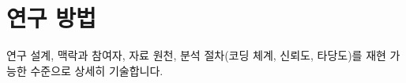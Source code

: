 \section{연구 방법}\label{sec:methods-kr}


연구 설계, 맥락과 참여자, 자료 원천, 분석 절차(코딩 체계, 신뢰도, 타당도)를
재현 가능한 수준으로 상세히 기술합니다.

